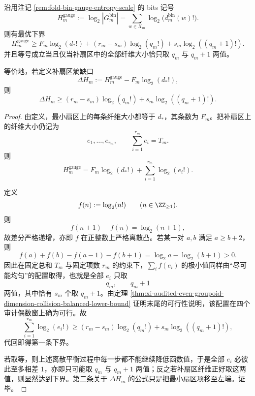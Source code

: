 \begin{theorem}[规范群熵的最优平衡下界与补扇区熵缺口]\label{thm:xi-audited-even-gauge-entropy-balanced-lower-bound}
沿用注记 \ref{rem:fold-bin-gauge-entropy-scale} 的 bits 记号
\[
H_m^{\mathrm{gauge}}
:=
\log_2|G_m^{\mathrm{bin}}|
=
\sum_{w\in X_m}\log_2\bigl(d_m^{\mathrm{bin}}(w)!\bigr).
\]
则有最优下界
\[
\boxed{\;
H_m^{\mathrm{gauge}}
\ge
F_m\log_2(d_*!)
+
(r_m-s_m)\log_2(q_m!)
+
s_m\log_2((q_m+1)!).\;}
\]
并且等号成立当且仅当补扇区中的全部纤维大小恰只取 \(q_m\) 与 \(q_m+1\) 两值。

等价地，若定义补扇区熵缺口
\[
\Delta H_m:=H_m^{\mathrm{gauge}}-F_m\log_2(d_*!),
\]
则
\[
\boxed{\;
\Delta H_m
\ge
(r_m-s_m)\log_2(q_m!)
+
s_m\log_2((q_m+1)!).\;}
\]
\end{theorem}
\begin{proof}
由定义，最小扇区上的每条纤维大小都等于 \(d_*\)，其条数为 \(F_m\)。把补扇区上的纤维大小仍记为
\[
e_1,\dots,e_{r_m},
\qquad
\sum_{i=1}^{r_m}e_i=T_m.
\]
则
\[
H_m^{\mathrm{gauge}}
=
F_m\log_2(d_*!)
+
\sum_{i=1}^{r_m}\log_2(e_i!).
\]

定义
\[
f(n):=\log_2(n!)
\qquad (n\in\ZZ_{\ge 1}).
\]
则
\[
f(n+1)-f(n)=\log_2(n+1),
\]
故差分严格递增，亦即 \(f\) 在正整数上严格离散凸。若某一对 \(a,b\) 满足 \(a\ge b+2\)，则
\[
f(a)+f(b)-f(a-1)-f(b+1)
=
\log_2 a-\log_2(b+1)
>0.
\]
因此在固定总和 \(T_m\) 与固定项数 \(r_m\) 的约束下，\(\sum_i f(e_i)\) 的极小值同样由“尽可能均匀”的配置取得，也就是全部 \(e_i\) 只取
\[
q_m,\qquad q_m+1
\]
两值，其中恰有 \(s_m\) 个取 \(q_m+1\)。由定理 \ref{thm:xi-audited-even-groupoid-dimension-collision-balanced-lower-bound} 证明末尾的可行性说明，该配置在四个审计偶数窗上确为可行。故
\[
\sum_{i=1}^{r_m}\log_2(e_i!)
\ge
(r_m-s_m)\log_2(q_m!)
+
s_m\log_2((q_m+1)!),
\]
代回即得第一条下界。

若取等，则上述离散平衡过程中每一步都不能继续降低函数值，于是全部 \(e_i\) 必彼此至多相差 \(1\)，亦即只可能取 \(q_m\) 与 \(q_m+1\) 两值；反之若补扇区纤维正好取这两值，则显然达到下界。第二条关于 \(\Delta H_m\) 的公式只是把最小扇区项移至左端。证毕。
\end{proof}

